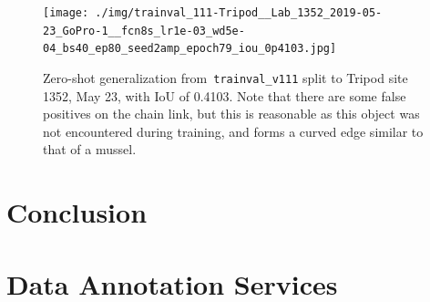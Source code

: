 \documentclass[11pt]{article} %
\begin{document}
\begin{figure}
\centering
\texttt{[image: ./img/trainval\_111-Tripod\_\_Lab\_1352\_2019-05-23\_GoPro-1\_\_fcn8s\_lr1e-03\_wd5e-04\_bs40\_ep80\_seed2amp\_epoch79\_iou\_0p4103.jpg]}
\caption{Zero-shot generalization from~\texttt{trainval\_v111} split to Tripod
site 1352, May 23, with IoU of 0.4103. Note that there are some false positives
on the chain link, but this is reasonable as this object was not encountered
during training, and forms a curved edge similar to that of a mussel.}
\label{fig:tripod-1352}
\end{figure}


\section{Conclusion}

\clearpage


\clearpage

\appendix

\section{Data Annotation Services}
\end{document}

